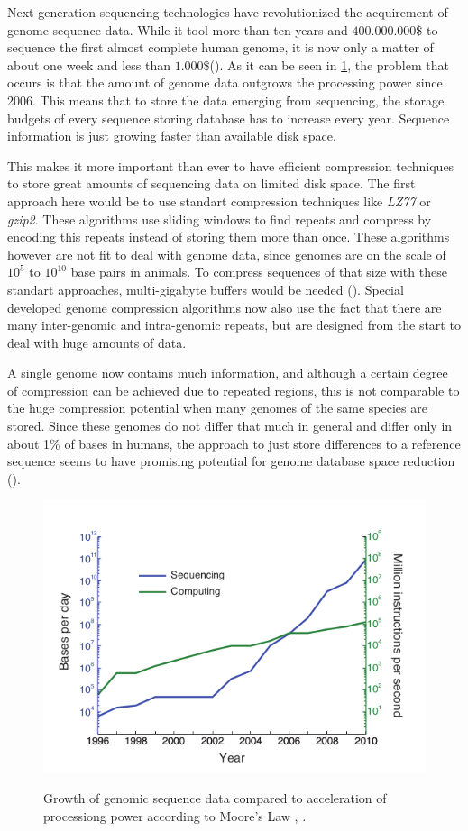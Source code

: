 \documentclass[acmtocl,acmnow]{article}
\begin{document}
Next generation sequencing technologies have revolutionized the acquirement of genome sequence data. While it tool more
than ten years and $400.000.000$\$ to sequence the first almost complete human genome, it is now only a matter of about
one week and less than $1.000$\$(\cite{LohBamBer}). As it can be seen in \ref{gspp}, the problem that occurs is that the
amount of genome data outgrows the processing power since 2006. This means that to store the data emerging from
sequencing, the storage budgets of every sequence storing database has to increase every year. Sequence information
is just growing faster than available disk space.

This makes it more important than ever to have efficient compression techniques to store great amounts of sequencing data
on limited disk space. 
The first approach here would be to use standart compression techniques like \emph{LZ77} or \emph{gzip2}. These algorithms
use sliding windows to find repeats and compress by encoding this repeats instead of storing them more than once. These
algorithms however are not fit to deal with genome data, since genomes are on the scale of $10^5$ to $10^{10}$ base pairs
in animals. To compress sequences of that size with these standart approaches, multi-gigabyte buffers would be needed
(\cite{DeoGra}).
Special developed genome compression algorithms now also use the fact that there are many inter-genomic and intra-genomic
repeats, but are designed from the start to deal with huge amounts of data.

A single genome now contains much information, and although a certain degree of compression can be
achieved due to repeated regions, this is not comparable to the huge compression potential when many genomes of the same 
species are stored. Since these
genomes do not differ that much in general and differ only in about 1\% of bases in humans, the approach
to just store differences to a reference sequence seems to have promising potential for genome database space reduction 
(\cite{LohBamBer}).

\begin{figure}
  \begin{center}
    \includegraphics[height=0.3\textwidth]{img/Moorevsgen.png}
    \label{gspp}
    \caption{Growth of genomic sequence data compared to acceleration of processiong power according to Moore's Law
            , \cite{LohBamBer}.}
  \end{center}
\end{figure}
\end{document}
